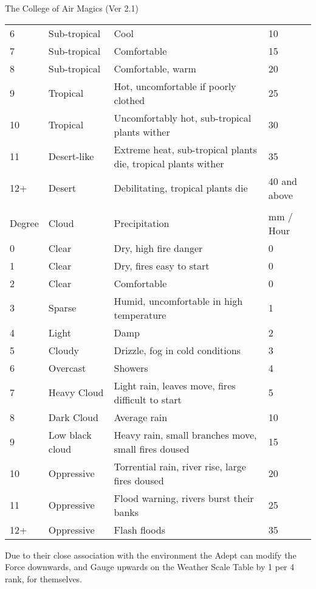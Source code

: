 \begin{Chapter}{The College of Air Magics (Ver 2.1)}
\begin{table*}
\begin{tabularx}{\linewidth}{llXl}
6 		& Sub-tropical 		& Cool									& 10 \\
7 		& Sub-tropical 		& Comfortable								& 15 \\
8 		& Sub-tropical 		& Comfortable, warm							& 20 \\
9 		& Tropical 		& Hot, uncomfortable if poorly clothed					& 25 \\
10 		& Tropical 		& Uncomfortably hot, sub-tropical plants wither				& 30 \\
11 		& Desert-like 		& Extreme heat, sub-tropical plants die, tropical plants wither		& 35 \\
12+ 		& Desert 		& Debilitating, tropical plants die					& 40 and above \\
\\
Degree 		& Cloud 		& Precipitation								& mm / Hour \\
0 		& Clear 		& Dry, high fire danger							& 0 \\
1 		& Clear 		& Dry, fires easy to start						& 0 \\
2 		& Clear 		& Comfortable								& 0 \\
3 		& Sparse 		& Humid, uncomfortable in high temperature				& 1 \\
4 		& Light 		& Damp									& 2 \\
5 		& Cloudy 		& Drizzle, fog in cold conditions					& 3 \\
6 		& Overcast 		& Showers								& 4 \\
7 		& Heavy Cloud 		& Light rain, leaves move, fires difficult to start			& 5 \\
8 		& Dark Cloud 		& Average rain								& 10 \\
9 		& Low black cloud 	& Heavy rain, small branches move, small fires doused			& 15 \\
10 		& Oppressive 		& Torrential rain, river rise, large fires doused			& 20 \\
11 		& Oppressive 		& Flood warning, rivers burst their banks				& 25 \\
12+		& Oppressive		& Flash floods								& 35 \\
\end{tabularx}

\begin{Description}
\item[T-1 Aerial Affinity (Air Mage Talent)] Due to their close
  association with the environment the Adept can modify the Force
  downwards, and Gauge upwards on the Weather Scale Table by 1 per 4
  rank, for themselves.


\end{Description}
\end{table*}
\end{Chapter}
